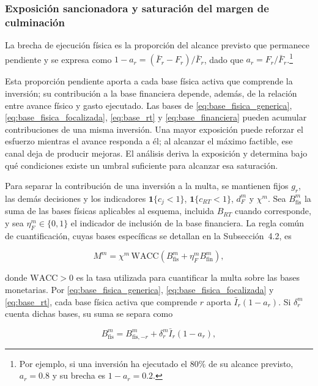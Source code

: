 \subsubsection{Exposición sancionadora y saturación del margen de culminación}

La brecha de ejecución física es la proporción del alcance previsto que permanece pendiente y se expresa como \(1-a_r=(\bar F_r-F_r)/\bar F_r\), dado que \(a_r=F_r/\bar F_r\).\footnote{Por ejemplo, si una inversión ha ejecutado el \(80\%\) de su alcance previsto, \(a_r=0.8\) y su brecha es \(1-a_r=0.2\).}

Esta proporción pendiente aporta a cada base física activa que comprende la inversión; su contribución a la base financiera depende, además, de la relación entre avance físico y gasto ejecutado. Las bases de \eqref{eq:base_fisica_generica}, \eqref{eq:base_fisica_focalizada}, \eqref{eq:base_rt} y \eqref{eq:base_financiera} pueden acumular contribuciones de una misma inversión. Una mayor exposición puede reforzar el esfuerzo mientras el avance responda a él; al alcanzar el máximo factible, ese canal deja de producir mejoras. El análisis deriva la exposición y determina bajo qué condiciones existe un umbral suficiente para alcanzar esa saturación.

Para separar la contribución de una inversión a la multa, se mantienen fijos \(g_r\), las demás decisiones y los indicadores \(\mathbf1\{c_j<1\}\), \(\mathbf1\{c_{RT}<1\}\), \(d_F^m\) y \(\chi^m\). Sea \(B_{\mathrm{fis}}^m\) la suma de las bases físicas aplicables al esquema, incluida \(B_{RT}\) cuando corresponde, y sea \(\eta_F^m\in\{0,1\}\) el indicador de inclusión de la base financiera. La regla común de cuantificación, cuyas bases específicas se detallan en la Subsección~4.2, es

\begin{equation}
\label{eq:multa_agregada_derivacion}
M^m=\chi^m\,\mathrm{WACC}
\left(B_{\mathrm{fis}}^m+\eta_F^m B_{\mathrm{fin}}^m\right),
\end{equation}

donde \(\mathrm{WACC}>0\) es la tasa utilizada para cuantificar la multa sobre las bases monetarias. Por \eqref{eq:base_fisica_generica}, \eqref{eq:base_fisica_focalizada} y \eqref{eq:base_rt}, cada base física activa que comprende \(r\) aporta \(\bar I_r(1-a_r)\). Si \(\delta_r^m\) cuenta dichas bases, su suma se separa como

\begin{equation}
\label{eq:separacion_base_fisica_r}
B_{\mathrm{fis}}^m
=
B_{\mathrm{fis},-r}^m
+\delta_r^m\bar I_r(1-a_r),
\end{equation}

